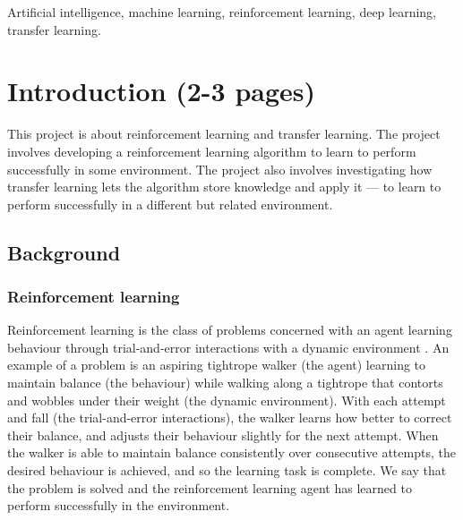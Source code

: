 \documentclass[12pt,a4paper]{article}
\begin{document}
\begin{keywords}
Artificial intelligence, machine learning, reinforcement learning, deep learning, transfer learning.
\end{keywords}

\section{Introduction (2-3 pages)}
This project is about reinforcement learning and transfer learning. The project involves developing a reinforcement learning algorithm to learn to perform successfully in some environment. The project also involves investigating how transfer learning lets the algorithm store knowledge and apply it --- to learn to perform successfully in a different but related environment.

\subsection{Background} 
\subsubsection{Reinforcement learning}
Reinforcement learning is the class of problems concerned with an agent learning behaviour through trial-and-error interactions with a dynamic environment \cite{Kaelbling1996}. An example of a problem is an aspiring tightrope walker (the agent) learning to maintain balance (the behaviour) while walking along a tightrope that contorts and wobbles under their weight (the dynamic environment). With each attempt and fall (the trial-and-error interactions), the walker learns how better to correct their balance, and adjusts their behaviour slightly for the next attempt. When the walker is able to maintain balance consistently over consecutive attempts, the desired behaviour is achieved, and so the learning task is complete. We say that the problem is solved and the reinforcement learning agent has learned to perform successfully in the environment.  
\end{document}
